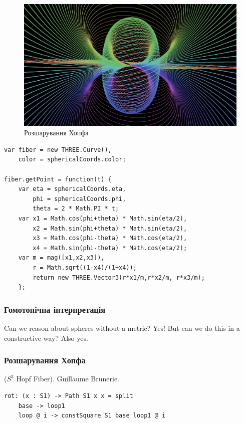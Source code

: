 \begin{definition}
\begin{definition}
\begin{definition}
\paragraph{}
\begin{figure}[h]
  \centerline{\includegraphics[scale=0.28]{hopf-2.jpeg}}
  \caption{Розшарування Хопфа}
\end{figure}

\begin{lstlisting}
var fiber = new THREE.Curve(),
    color = sphericalCoords.color;

fiber.getPoint = function(t) {
    var eta = sphericalCoords.eta,
        phi = sphericalCoords.phi,
        theta = 2 * Math.PI * t;
    var x1 = Math.cos(phi+theta) * Math.sin(eta/2),
        x2 = Math.sin(phi+theta) * Math.sin(eta/2),
        x3 = Math.cos(phi-theta) * Math.cos(eta/2),
        x4 = Math.sin(phi-theta) * Math.cos(eta/2);
    var m = mag([x1,x2,x3]),
        r = Math.sqrt((1-x4)/(1+x4));
        return new THREE.Vector3(r*x1/m,r*x2/m, r*x3/m);
    };
\end{lstlisting}

\newpage
\subsubsection*{Гомотопічна інтерпретація}

Can we reason about spheres without a metric? Yes!
But can we do this in a constructive way? Also yes.


\subsubsection{Розшарування Хопфа}

\begin{example} ($S^3$ Hopf Fiber).
Guillaume Brunerie.
\begin{lstlisting}
rot: (x : S1) -> Path S1 x x = split
    base -> loop1
    loop @ i -> constSquare S1 base loop1 @ i


\end{lstlisting}
\end{example}
\end{definition}
\end{definition}
\end{definition}
